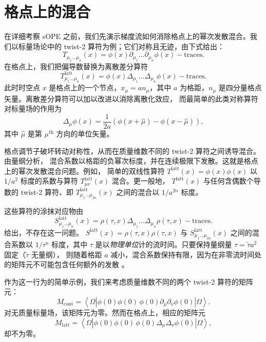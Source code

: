 \section{\label{sec:lattsmear} 格点上的混合}

在详细考察 sOPE 之前，我们先演示梯度流如何消除格点上的幂次发散混合。我们以标量场论中的
twist-2 算符为例；它们对称且无迹，由下式给出：
\begin{equation}
T_{\mu_1\ldots\mu_n}(x) = \phi(x)\partial_{\mu_1}\ldots
\partial_{\mu_n}\phi(x) - \mathrm{traces}.
\end{equation}
在格点上，我们把偏导数替换为离散差分算符
\begin{equation}
T_{\mu_1\ldots\mu_n}^{\mathrm{latt}}(x) = \phi(x)\Delta_{\mu_1}\ldots
\Delta_{\mu_n}\phi(x) -
\mathrm{traces}.
\end{equation}
此时时空点 $x$ 是格点上的一个节点，$x_\mu =
an_\mu$，其中 $a$ 为格距，$n_\mu$ 是四分量格点矢量。离散差分算符可以加以改进以消除离散化效应，
而最简单的此类对称算符对标量场的作用为
\begin{equation}
\Delta_\mu \phi(x) = \frac{1}{2a}\left(\phi(x+\widehat{\mu}) -
\phi(x-\widehat{\mu})\right),
\end{equation}
其中 $\hat{\mu}$ 是第 $\mu^{\mathrm{th}}$ 方向的单位矢量。

格点调节子破坏转动对称性，从而在质量维数不同的 twist-2 算符之间诱导混合。由量纲分析，
混合系数以格距的负幂次标度，并在连续极限下发散。这就是格点上的幂次发散混合问题。例如，
简单的双线性算符 $T^{\mathrm{latt}}(x) = \phi(x) \phi(x)$ 以 $1/a^2$
标度的系数与算符 $T_{\mu\nu}^{\mathrm{latt}}(x)$ 混合。更一般地，
$T^{\mathrm{latt}}(x)$ 与任何含偶数个导数的 twist-2 算符、即
$T_{\mu_1\ldots\mu_{2n}}^{\mathrm{latt}}(x)$ 之间的混合以 $1/a^{2n}$ 标度。

这些算符的涂抹对应物由
\begin{equation}
S_{\mu_1\ldots\mu_n}^{\mathrm{latt}}(x) =
\rho(\tau,x)\Delta_{\mu_1}\ldots
\Delta_{\mu_n}\rho(\tau,x) -
\mathrm{traces}.
\end{equation}
给出，不存在这一问题。
$S^{\mathrm{latt}}(x) = \rho(\tau,x) \rho(\tau,x)$ 与
$S_{\mu_1\ldots\mu_{2n}}^{\mathrm{latt}}(x)$ 之间的混合系数以
$1/\tau^{n}$ 标度，其中 $\tau$ 是以\emph{物理单位}计的流时间。只要保持量纲量
$\tau=\widetilde{\tau}a^2$ 固定（$\widetilde{\tau}$ 无量纲），
则随着格距 $a$ 减小，混合系数保持有限，因为在非零流时间处的矩阵元不可能包含任何额外的发散
\cite{Makino:2014sta,Luscher:2011bx}。

作为这一行为的简单示例，我们来考虑质量维数不同的两个 twist-2 算符的矩阵元：
\begin{equation}
M_{\mathrm{cont}} = \left\langle \Omega | \phi(0) \phi(0) \,\phi(0)
\partial_\mu\partial_\nu \phi(0) |\Omega \right\rangle.
\end{equation}
对无质量标量场，该矩阵元为零。然而在格点上，相应的矩阵元
\begin{equation}
M_{\mathrm{latt}} = \left\langle \Omega | \phi(0) \phi(0) \,\phi(0)
\Delta_\mu\Delta_\nu \phi(0) |\Omega \right\rangle,
\end{equation}
却不为零。

